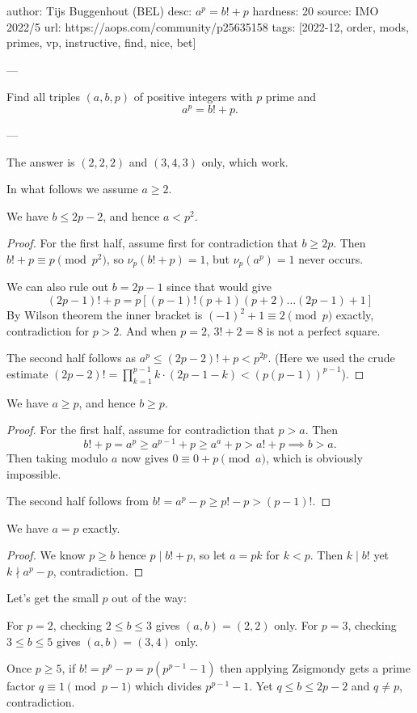 author: Tijs Buggenhout (BEL)
desc: $a^p = b!+p$
hardness: 20
source: IMO 2022/5
url: https://aops.com/community/p25635158
tags: [2022-12, order, mods, primes, vp, instructive, find, nice, bet]

---

Find all triples $(a,b,p)$ of positive integers with $p$ prime and
\[ a^p=b!+p. \]

---

The answer is $(2,2,2)$ and $(3,4,3)$ only, which work.

In what follows we assume $a \ge 2$.

\begin{claim*}
  We have $b \le 2p-2$, and hence $a < p^2$.
\end{claim*}
\begin{proof}
  For the first half, assume first for contradiction that $b \ge 2p$.
  Then $b!+p \equiv p \pmod{p^2}$, so $\nu_p(b!+p)=1$,
  but $\nu_p(a^p)=1$ never occurs.

  We can also rule out $b = 2p-1$ since that would give
  \[ (2p-1)!+p = p \left[ (p-1)! (p+1)(p+2)\dots(2p-1) + 1 \right] \]
  By Wilson theorem the inner bracket is $(-1)^2+1 \equiv 2 \pmod p$
  exactly, contradiction for $p > 2$.
  And when $p=2$, $3!+2=8$ is not a perfect square.

  The second half follows as $a^p \le (2p-2)!+p < p^{2p}$.
  (Here we used the crude estimate
  $(2p-2)! = \prod_{k=1}^{p-1}k \cdot (2p-1-k) < (p(p-1))^{p-1}$).
\end{proof}

\begin{claim*}
  We have $a \ge p$, and hence $b \ge p$.
\end{claim*}
\begin{proof}
  For the first half, assume for contradiction that $p > a$.
  Then
  \[ b! + p = a^p \ge a^{p-1} + p \ge a^a + p > a! + p \implies b > a. \]
  Then taking modulo $a$ now gives $0 \equiv 0 + p \pmod{a}$,
  which is obviously impossible.

  The second half follows from $b! = a^p-p \ge p! - p > (p-1)!$.
\end{proof}

\begin{claim*}
  We have $a=p$ exactly.
\end{claim*}
\begin{proof}
  We know $p \ge b$ hence $p \mid b!+p$, so let $a = pk$ for $k < p$.
  Then $k \mid b!$ yet $k \nmid a^p-p$, contradiction.
\end{proof}

Let's get the small $p$ out of the way:
\begin{itemize}
  \ii For $p=2$, checking $2 \le b \le 3$ gives $(a,b)=(2,2)$ only.
  \ii For $p=3$, checking $3 \le b \le 5$ gives $(a,b)=(3,4)$ only.
\end{itemize}
Once $p \ge 5$, if $b! = p^p - p = p(p^{p-1}-1)$
then applying Zsigmondy gets a prime factor $q \equiv 1 \pmod{p-1}$
which divides $p^{p-1}-1$.
Yet $q \le b \le 2p-2$ and $q \neq p$, contradiction.
